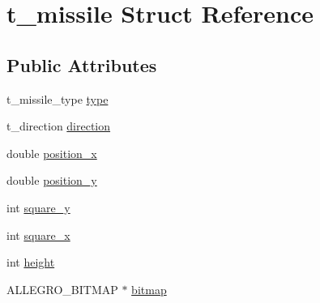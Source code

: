 \hypertarget{structt__missile}{\section{t\-\_\-missile Struct Reference}
\label{structt__missile}
}
\subsection*{Public Attributes}
\begin{DoxyCompactItemize}
\item 
t\-\_\-missile\-\_\-type \hyperlink{structt__missile_afba313b8a83b91562bef1ccad8ff3f92}{type}
\item 
t\-\_\-direction \hyperlink{structt__missile_ae4dadc8f7d044549eee89b6a3269ea16}{direction}
\item 
double \hyperlink{structt__missile_ad3b6c8669fcc124c1937dbe83055c59c}{position\-\_\-x}
\item 
double \hyperlink{structt__missile_ab72534e808fc45603282f9728de6f9cc}{position\-\_\-y}
\item 
int \hyperlink{structt__missile_a4787f7554bd035014ca6b4d5b61f4149}{square\-\_\-y}
\item 
int \hyperlink{structt__missile_a0f63c73c2c0f46fc1187f4ab604b6859}{square\-\_\-x}
\item 
int \hyperlink{structt__missile_a6b80ab2e879a495fb9b9759a8764e995}{height}
\item 
A\-L\-L\-E\-G\-R\-O\-\_\-\-B\-I\-T\-M\-A\-P $\ast$ \hyperlink{structt__missile_ab9bf06a913015c3de3c23f1fe8870306}{bitmap}
\end{DoxyCompactItemize}



